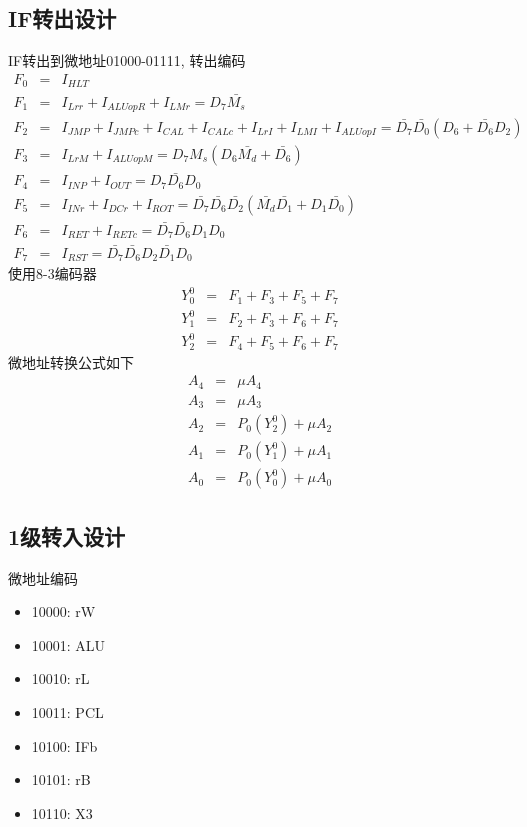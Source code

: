 \documentclass[10pt]{book}
\begin{document}
\subsection{IF转出设计}
IF转出到微地址01000-01111, 转出编码
\begin{eqnarray*}
F_0			&=& I_{HLT} \\
F_1			&=& I_{Lrr}+I_{ALUopR}+I_{LMr} = D_7\bar{M_s} \\
F_2			&=& I_{JMP}+I_{JMPc}+I_{CAL}+I_{CALc}+I_{LrI}+I_{LMI}+I_{ALUopI} = \bar{D_7}\bar{D_0}(D_6+\bar{D_6}D_2) \\
F_3			&=& I_{LrM}+I_{ALUopM} = D_7 M_s(D_6\bar{M_d}+\bar{D_6}) \\
F_4			&=& I_{INP}+I_{OUT} = D_7\bar{D_6}D_0 \\
F_5			&=& I_{INr}+I_{DCr}+I_{ROT} = \bar{D_7}\bar{D_6}\bar{D_2}(\bar{M_d}\bar{D_1}+D_1\bar{D_0}) \\
F_6			&=& I_{RET}+I_{RETc} = \bar{D_7}\bar{D_6}D_1 D_0 \\
F_7			&=& I_{RST} = \bar{D_7}\bar{D_6}D_2\bar{D_1}D_0
\end{eqnarray*}
使用8-3编码器
\begin{eqnarray*}
Y_0^0		&=& F_1+F_3+F_5+F_7 \\
Y_1^0		&=& F_2+F_3+F_6+F_7 \\
Y_2^0		&=& F_4+F_5+F_6+F_7 
\end{eqnarray*}
微地址转换公式如下
\begin{eqnarray*}
A_4 &=& \mu A_4 \\
A_3 &=& \mu A_3 \\
A_2 &=& P_0(Y_2^0)+\mu A_2 \\
A_1 &=& P_0(Y_1^0)+\mu A_1 \\
A_0 &=& P_0(Y_0^0)+\mu A_0
\end{eqnarray*}

\subsection{1级转入设计}
微地址编码
\begin{itemize}
  \item 10000: rW
  \item 10001: ALU
  \item 10010: rL
  \item 10011: PCL
  \item 10100: IFb
  \item 10101: rB
  \item 10110: X3
\end{itemize}
\end{document}

